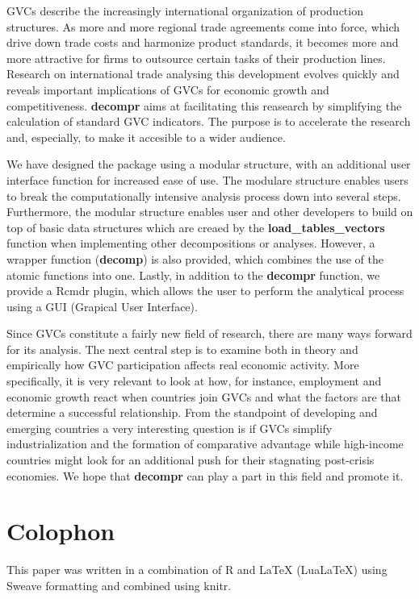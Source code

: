 \documentclass[a4paper]{article}\usepackage[]{graphicx}\usepackage[]{color}
\begin{document}
GVCs describe the increasingly international organization of production structures.
As more and more regional trade agreements come into force, 
which drive down trade costs and harmonize product standards,
it becomes more and more attractive for firms to outsource certain tasks of their production lines.
Research on international trade analysing this development evolves quickly and reveals important implications of GVCs for economic growth and competitiveness.  
\textbf{decompr} aims at facilitating this reasearch by simplifying the calculation of standard GVC indicators.
The purpose is to accelerate the research and, especially, to make it accesible to a wider audience.

We have designed the package using a modular structure, with an additional user interface function for increased ease of use.
The modulare structure enables users to break the computationally intensive analysis process down into several steps.
Furthermore, the modular structure enables user and other developers to build on top of basic data structures which are creaed by the \textbf{load\_tables\_vectors} function when implementing other decompositions or analyses.
However, a wrapper function (\textbf{decomp}) is also provided, which combines the use of the atomic functions into one.
Lastly, in addition to the \textbf{decompr} function, we provide a Rcmdr plugin, which allows the user to perform the analytical process using a GUI (Grapical User Interface).


Since GVCs constitute a fairly new field of research, there are many ways forward for its analysis. 
The next central step is to examine both in theory and empirically how GVC participation affects real economic activity. 
More specifically, it is very relevant to look at how, for instance, 
employment and economic growth react when countries join GVCs and what the factors are that determine a successful relationship. 
From the standpoint of developing and emerging countries a very interesting question is if GVCs simplify industrialization 
and the formation of comparative advantage 
while high-income countries might look for an additional push for their stagnating post-crisis economies. 
We hope that \textbf{decompr} can play a part in this field and promote it.


\section*{Colophon}
This paper was written in a combination of R and LaTeX (LuaLaTeX) using Sweave formatting and combined using knitr. 

\newpage
\printbibliography
\end{document}
